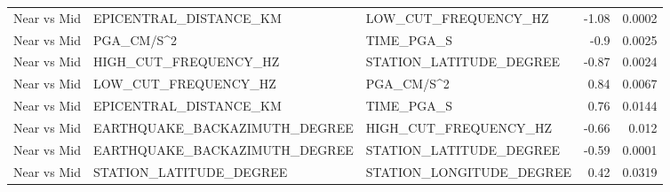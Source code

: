 \begin{table}[H]
\begin{tabular}{lllrr}
Near vs Mid & EPICENTRAL_DISTANCE_KM & LOW_CUT_FREQUENCY_HZ & -1.08 & 0.0002 \\
Near vs Mid & PGA_CM/S^2 & TIME_PGA_S & -0.9 & 0.0025 \\
Near vs Mid & HIGH_CUT_FREQUENCY_HZ & STATION_LATITUDE_DEGREE & -0.87 & 0.0024 \\
Near vs Mid & LOW_CUT_FREQUENCY_HZ & PGA_CM/S^2 & 0.84 & 0.0067 \\
Near vs Mid & EPICENTRAL_DISTANCE_KM & TIME_PGA_S & 0.76 & 0.0144 \\
Near vs Mid & EARTHQUAKE_BACKAZIMUTH_DEGREE & HIGH_CUT_FREQUENCY_HZ & -0.66 & 0.012 \\
Near vs Mid & EARTHQUAKE_BACKAZIMUTH_DEGREE & STATION_LATITUDE_DEGREE & -0.59 & 0.0001 \\
Near vs Mid & STATION_LATITUDE_DEGREE & STATION_LONGITUDE_DEGREE & 0.42 & 0.0319 \\
\bottomrule
\end{tabular}
\end{table}
